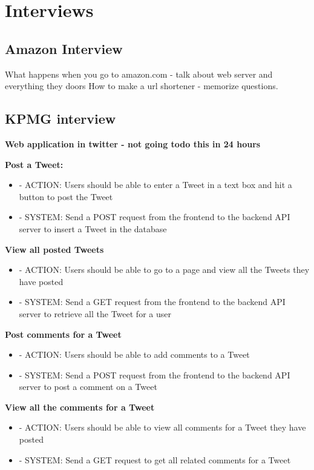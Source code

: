 
\chapter{Interviews}

\section*{Amazon Interview}

What happens when you go to amazon.com - talk about web server and everything they doors
How to make a url shortener - memorize questions.

\section*{KPMG interview}
\textbf{Web application in twitter - not going todo this in 24 hours}

\textbf{Post a Tweet:}
\begin{itemize}
\item - ACTION: Users should be able to enter a Tweet in a text box and hit a button to post the Tweet
\item - SYSTEM: Send a POST request from the frontend to the backend API server to insert a Tweet in
the database
\end{itemize}

\textbf{View all posted Tweets}
\begin{itemize}
\item - ACTION: Users should be able to go to a page and view all the Tweets they have posted
\item - SYSTEM: Send a GET request from the frontend to the backend API server to retrieve all the Tweet for a user
\end{itemize}
\textbf{Post comments for a Tweet}

\begin{itemize}
\item - ACTION: Users should be able to add comments to a Tweet
\item - SYSTEM: Send a POST request from the frontend to the backend API server to post a comment on a Tweet
\end{itemize}

\textbf{View all the comments for a Tweet}

\begin{itemize}
\item - ACTION: Users should be able to view all comments for a Tweet they have posted
\item - SYSTEM: Send a GET request to get all related comments for a Tweet
\end{itemize}

